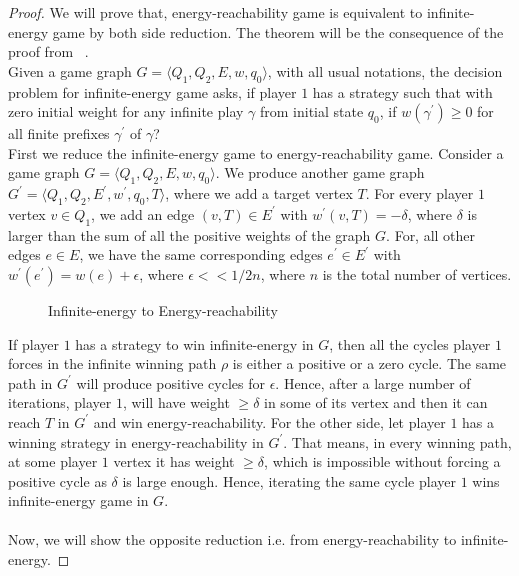 \begin{proof}
We will prove that, energy-reachability game is equivalent to infinite-energy game by both side reduction. The theorem will be the consequence of the proof from ~\cite{DBLP:conf/formats/BouyerFLMS08}.\\

Given a game graph $G=\langle Q_1, Q_2, E, w, q_0\rangle$, with all usual notations, the decision problem for infinite-energy game asks, if player $1$ has a strategy such that with zero initial weight for any infinite play $\gamma$ from initial state $q_0$, if $w(\gamma^{\prime}) \geq 0$ for all finite prefixes $\gamma^{\prime}$ of $\gamma$? \\
First we reduce the infinite-energy game to energy-reachability game.
Consider a game graph $G=\langle Q_1, Q_2, E, w, q_0\rangle$. We produce another game graph $G^{\prime}=\langle Q_1, Q_2, E^{\prime}, w^{\prime}, q_0,T\rangle$, where we add a target vertex $T$. For every player $1$ vertex $v \in Q_1$, we add an edge $(v,T) \in E^{\prime}$ with $w^{\prime}(v,T) = -\delta$, where $\delta$ is larger than the sum of all the positive weights of the graph $G$. For, all other edges $e \in E$, we have the same corresponding edges $e^{\prime} \in E^{\prime}$ with $w^{\prime}(e^{\prime})= w(e)+ \epsilon$, where $\epsilon << 1/2n$, where $n$ is the total number of vertices.
\begin{figure}
    \label{inf-reach}
    \centering
    
    \caption{Infinite-energy to Energy-reachability}
\end{figure}

If player $1$ has a strategy to win infinite-energy in $G$, then all the cycles player $1$ forces in the infinite winning path $\rho$ is either a positive or a zero cycle. The same path in $G^{\prime}$ will produce positive cycles for $\epsilon$. Hence, after a large number of iterations, player $1$, will have weight $\geq \delta$ in some of its vertex and then it can reach $T$ in $G^{\prime}$ and win energy-reachability. For the other side, let player $1$ has a winning strategy in energy-reachability in $G^{\prime}$. That means, in every winning path, at some player $1$ vertex it has weight $\geq \delta$, which is impossible without forcing a positive cycle as $\delta$ is large enough. Hence, iterating the same cycle player $1$ wins infinite-energy game in $G$.\\
\\
Now, we will show the opposite reduction i.e. from energy-reachability to infinite-energy.  
\end{proof}


